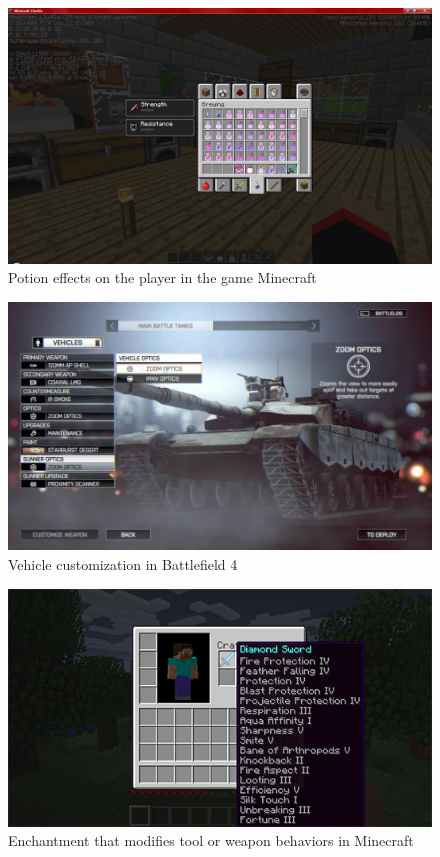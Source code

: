 \begin{multicols}{2}
\begin{figure}[H]
	\centering
	\includegraphics[width=\fullwidth]{assets/minecraft-potion}
	\caption{Potion effects on the player in the game Minecraft}
	\label{fig:minecraft-potion-effect}
\end{figure}

\begin{figure}[H]
	\centering
	\includegraphics[width=\fullwidth]{assets/bf4-vehicle-mod}
	\caption{Vehicle customization in Battlefield 4}
	\label{fig:bf4-vehicle-mods}
\end{figure}

\begin{figure}[H]
	\centering
	\includegraphics[width=\fullwidth]{assets/minecraft-enchant}
	\caption{Enchantment that modifies tool or weapon behaviors in Minecraft}
	\label{fig:minecraft-enchantments}
\end{figure}



\end{multicols}
